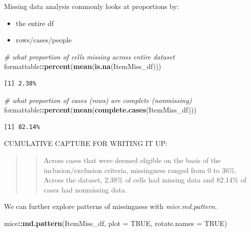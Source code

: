 \documentclass[
  11pt,
]{book}
\newenvironment{Shaded}{\begin{snugshade}}{\end{snugshade}}
\newcommand{\AttributeTok}[1]{\textcolor[rgb]{0.27,0.27,0.27}{#1}}
\newcommand{\CommentTok}[1]{\textcolor[rgb]{0.37,0.37,0.37}{\textit{#1}}}
\newcommand{\ConstantTok}[1]{\textcolor[rgb]{0.37,0.37,0.37}{#1}}
\newcommand{\FunctionTok}[1]{\textcolor[rgb]{0.27,0.27,0.27}{\textbf{#1}}}
\newcommand{\NormalTok}[1]{#1}
\newcommand{\SpecialCharTok}[1]{\textcolor[rgb]{0.43,0.43,0.43}{\textbf{#1}}}
\providecommand{\tightlist}{%
  \setlength{\itemsep}{0pt}\setlength{\parskip}{0pt}}
\begin{document}
Missing data analysis commonly looks at proportions by:

\begin{itemize}
\tightlist
\item
  the entire df
\item
  rows/cases/people
\end{itemize}

\begin{Shaded}
\begin{Highlighting}[]
\CommentTok{\# what proportion of cells missing across entire dataset}
\NormalTok{formattable}\SpecialCharTok{::}\FunctionTok{percent}\NormalTok{(}\FunctionTok{mean}\NormalTok{(}\FunctionTok{is.na}\NormalTok{(ItemMiss\_df)))}
\end{Highlighting}
\end{Shaded}

\begin{verbatim}
[1] 2.38%
\end{verbatim}

\begin{Shaded}
\begin{Highlighting}[]
\CommentTok{\# what proportion of cases (rows) are complete (nonmissing)}
\NormalTok{formattable}\SpecialCharTok{::}\FunctionTok{percent}\NormalTok{(}\FunctionTok{mean}\NormalTok{(}\FunctionTok{complete.cases}\NormalTok{(ItemMiss\_df)))}
\end{Highlighting}
\end{Shaded}

\begin{verbatim}
[1] 82.14%
\end{verbatim}

CUMULATIVE CAPTURE FOR WRITING IT UP:

\begin{quote}
\begin{quote}
Across cases that were deemed eligible on the basis of the inclusion/exclusion criteria, missingness ranged from 0 to 36\%. Across the dataset, 2.38\% of cells had missing data and 82.14\% of cases had nonmissing data.
\end{quote}
\end{quote}

We can further explore patterns of missingness with \emph{mice.md.pattern}.

\begin{Shaded}
\begin{Highlighting}[]
\NormalTok{mice}\SpecialCharTok{::}\FunctionTok{md.pattern}\NormalTok{(ItemMiss\_df, }\AttributeTok{plot =} \ConstantTok{TRUE}\NormalTok{, }\AttributeTok{rotate.names =} \ConstantTok{TRUE}\NormalTok{)}
\end{Highlighting}
\end{Shaded}
\end{document}
